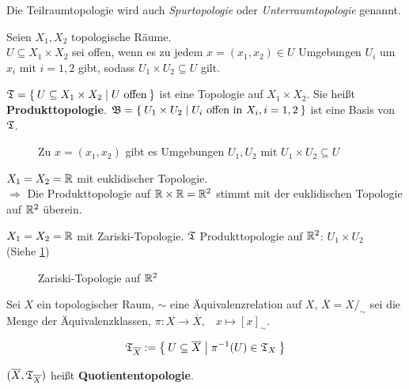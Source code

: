 Die Teilraumtopologie wird auch \textit{Spurtopologie} oder 
\textit{Unterraumtopologie} genannt.

\begin{definition}%
    Seien $X_1, X_2$ topologische Räume.\\
    $U \subseteq X_1 \times X_2$ sei offen, wenn es zu jedem $x = (x_1, x_2) \in U$
    Umgebungen $U_i$ um $x_i$  mit $i=1,2$ gibt, sodass $U_1 \times U_2 \subseteq U$
    gilt.

    $\mathfrak{T} = \Set{U \subseteq X_1 \times X_2 | U \text{ offen}}$
    ist eine Topologie auf $X_1 \times X_2$. Sie heißt \textbf{Produkttopologie}.
    $\mathfrak{B} = \Set{U_1 \times U_2 | U_i \text{ offen in } X_i, i=1,2}$
    ist eine Basis von $\mathfrak{T}$.
\end{definition}

\begin{figure}[htp]
    \centering
    
    \caption{Zu $x=(x_1, x_2)$ gibt es Umgebungen $U_1, U_2$ mit $U_1 \times U_2 \subseteq U$}
\end{figure}

\begin{beispiel}[Produkttopologien]
    \begin{bspenum}
        \item $X_1 = X_2 = \mathbb{R}$ mit euklidischer Topologie.\\
              $\Rightarrow$ Die Produkttopologie auf $\mathbb{R} \times \mathbb{R} = \mathbb{R}^2$
              stimmt mit der euklidischen Topologie auf $\mathbb{R}^2$ überein.
        \item $X_1 = X_2 = \mathbb{R}$ mit Zariski-Topologie.
              $\mathfrak{T}$ Produkttopologie auf $\mathbb{R}^2$: $U_1 \times U_2$\\
              (Siehe \cref{fig:zariski-topologie})
    \end{bspenum}

    \begin{figure}[htp]
        \centering
        
        \caption{Zariski-Topologie auf $\mathbb{R}^2$}
        \label{fig:zariski-topologie}
    \end{figure}
\end{beispiel}

\begin{definition}%
    Sei $X$ ein topologischer Raum, $\sim$ eine Äquivalenzrelation auf $X$,
    $\overline{X} = X /_\sim$ sei die Menge der Äquivalenzklassen,
    $\pi: X \rightarrow \overline{X}, \;\;\; x \mapsto [x]_\sim$.

    \[\mathfrak{T}_{\overline{X}} := \Set{U \subseteq \overline{X} | \pi^{-1}(U) \in \mathfrak{T}_X}\]

    $(\overline{X}, \mathfrak{T}_{\overline{X}})$ heißt \textbf{Quotiententopologie}.
\end{definition}

